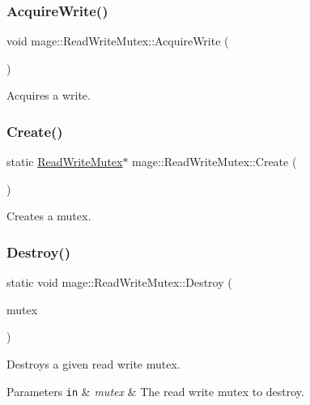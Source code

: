 \subsubsection{\texorpdfstring{Acquire\+Write()}{AcquireWrite()}}
{\footnotesize\ttfamily void mage\+::\+Read\+Write\+Mutex\+::\+Acquire\+Write (\begin{DoxyParamCaption}{ }\end{DoxyParamCaption})\hspace{0.3cm}{\ttfamily [private]}}

Acquires a write. \hypertarget{classmage_1_1_read_write_mutex_ad184ba46c44446b5ebe1026801fcac9b}{}\label{classmage_1_1_read_write_mutex_ad184ba46c44446b5ebe1026801fcac9b} 
\subsubsection{\texorpdfstring{Create()}{Create()}}
{\footnotesize\ttfamily static \hyperlink{classmage_1_1_read_write_mutex}{Read\+Write\+Mutex}$\ast$ mage\+::\+Read\+Write\+Mutex\+::\+Create (\begin{DoxyParamCaption}{ }\end{DoxyParamCaption})\hspace{0.3cm}{\ttfamily [static]}}

Creates a mutex. \hypertarget{classmage_1_1_read_write_mutex_a879992fe8bf7fc81df9fa5ffa1c380a3}{}\label{classmage_1_1_read_write_mutex_a879992fe8bf7fc81df9fa5ffa1c380a3} 
\subsubsection{\texorpdfstring{Destroy()}{Destroy()}}
{\footnotesize\ttfamily static void mage\+::\+Read\+Write\+Mutex\+::\+Destroy (\begin{DoxyParamCaption}\item[{\hyperlink{classmage_1_1_read_write_mutex}{Read\+Write\+Mutex} $\ast$}]{mutex }\end{DoxyParamCaption})\hspace{0.3cm}{\ttfamily [static]}}

Destroys a given read write mutex.


\begin{DoxyParams}[1]{Parameters}
\mbox{\tt in}  & {\em mutex} & The read write mutex to destroy. \\
\hline
\end{DoxyParams}
\hypertarget{classmage_1_1_read_write_mutex_a408e06f3c8bcc644e43afbf7e9ac772f}{}\label{classmage_1_1_read_write_mutex_a408e06f3c8bcc644e43afbf7e9ac772f} 
